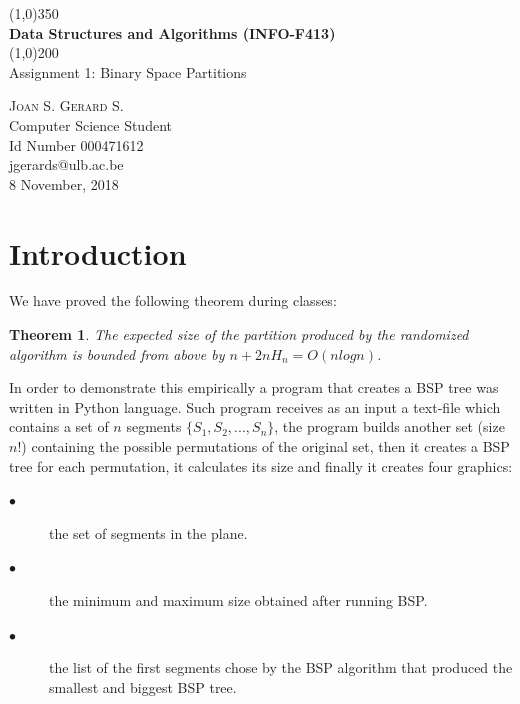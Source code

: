 \documentclass{article}
\newtheorem{theorem}{Theorem}
\begin{document}
\begin{titlepage}
	\begin{center}
		\line(1,0){350} \\
		\Huge{\bfseries Data Structures and Algorithms (INFO-F413)} \\
		\line(1,0){200} \\
		[1.5cm]
		\huge{Assignment 1: Binary Space Partitions} \\
		[10cm]
	\end{center}
	
	\begin{flushright}
	\textsc{\large Joan S. Gerard S.} \\
	Computer Science Student \\
	Id Number 000471612 \\
	jgerards@ulb.ac.be\\
	8 November, 2018 \\
	
	\end{flushright}
	
\end{titlepage}

\tableofcontents
\thispagestyle{empty}
\cleardoublepage

\listoffigures
\thispagestyle{empty}
\cleardoublepage

\setcounter{page}{1}
\section{Introduction}\label{sec:intro}

We have proved the following theorem during classes:

\begin{theorem}\label{the:theorem}
The expected size of the partition produced by the randomized algorithm is bounded from above by $n + 2nH_n = O(nlogn)$.
\end{theorem}

In order to demonstrate this empirically a program that creates a BSP tree was written in Python language. Such program receives as an input a text-file which contains
a set of $n$ segments $\{S_1, S_2, ..., S_n\}$, the program builds another set (size $n!$) containing the possible permutations of the original set, then
it creates a BSP tree for each permutation, it calculates its size and finally it creates four graphics:
\begin{description}
\item[$\bullet$] the set of segments in the plane.
\item[$\bullet$] the minimum and maximum size obtained after running BSP.
\item[$\bullet$] the list of the first segments chose by the BSP algorithm that produced the smallest and biggest BSP tree.
\end{description}
\end{document}

